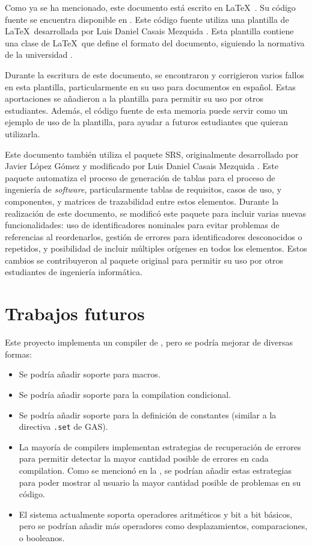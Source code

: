 Como ya se ha mencionado, este documento está escrito en
\LaTeX~\parencite{latex}. Su código fuente se encuentra disponible en
\myreportrepo. Este código fuente utiliza una plantilla de \LaTeX~desarrollada
por Luis Daniel Casais Mezquida \parencite{UC3Mtemplate}. Esta plantilla
contiene una clase de \LaTeX~que define el formato del documento, siguiendo la
normativa de la universidad \parencite{report-guidelines}.

Durante la escritura de este documento, se encontraron y corrigieron varios
fallos en esta plantilla, particularmente en su uso para documentos en español.
Estas aportaciones se añadieron a la plantilla para permitir su uso por otros
estudiantes. Además, el código fuente de esta memoria puede servir como un
ejemplo de uso de la plantilla, para ayudar a futuros estudiantes que quieran
utilizarla.

Este documento también utiliza el paquete SRS, originalmente desarrollado por
Javier López Gómez y modificado por Luis Daniel Casais Mezquida
\parencite{srs-package}. Este paquete automatiza el proceso de generación de
tablas para el proceso de ingeniería de \textit{software}, particularmente
tablas de requisitos, casos de uso, y componentes, y matrices de trazabilidad
entre estos elementos. Durante la realización de este documento, se modificó
este paquete para incluir varias nuevas funcionalidades: uso de identificadores
nominales para evitar problemas de referencias al reordenarlos, gestión de
errores para identificadores desconocidos o repetidos, y posibilidad de incluir
múltiples orígenes en todos los elementos. Estos cambios se contribuyeron al
paquete original para permitir su uso por otros estudiantes de ingeniería
informática.

\section{Trabajos futuros}\label{sec:future-work}

Este proyecto implementa un \gls{compiler} de ,
pero se podría mejorar de diversas formas:

\begin{itemize}
    \item Se podría añadir soporte para \glspl{macro}.
    \item Se podría añadir soporte para la \gls{compilation} condicional.
    \item Se podría añadir soporte para la definición de constantes (similar a
    la directiva \verb!.set! de \gls{GAS}).
    \item La mayoría de \glspl{compiler} implementan estrategias de recuperación
    de errores para permitir detectar la mayor cantidad posible de errores en
    cada \gls{compilation}. Como se mencionó en la , se podrían añadir estas estrategias para poder
    mostrar al usuario la mayor cantidad posible de problemas en su código.
    \item El sistema actualmente soporta operadores aritméticos y bit a bit
    básicos, pero se podrían añadir más operadores como desplazamientos,
    comparaciones, o booleanos.
\end{itemize}

